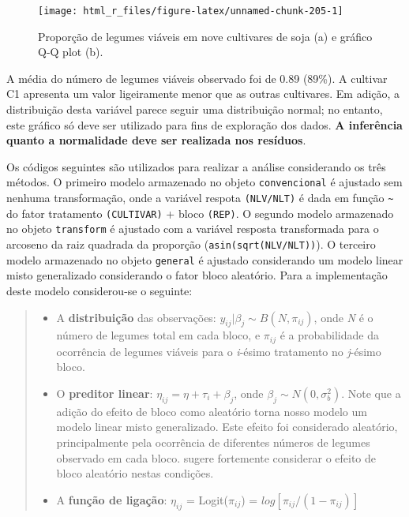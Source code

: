 \documentclass[
]{book}
\begin{document}
\begin{figure}

{\centering \texttt{[image: html\_r\_files/figure-latex/unnamed-chunk-205-1]} 

}

\caption{Proporção de legumes viáveis em nove cultivares de soja (a) e gráfico Q-Q plot (b).}\label{fig:unnamed-chunk-205}
\end{figure}

A média do número de legumes viáveis observado foi de 0.89 (89\%). A cultivar C1 apresenta um valor ligeiramente menor que as outras cultivares. Em adição, a distribuição desta variável parece seguir uma distribuição normal; no entanto, este gráfico só deve ser utilizado para fins de exploração dos dados. \textbf{A inferência quanto a normalidade deve ser realizada nos resíduos}.

Os códigos seguintes são utilizados para realizar a análise considerando os três métodos. O primeiro modelo armazenado no objeto \texttt{convencional} é ajustado sem nenhuma transformação, onde a variável respota \texttt{(NLV/NLT)} é dada em função \texttt{\textasciitilde{}} do fator tratamento \texttt{(CULTIVAR)} + bloco \texttt{(REP)}. O segundo modelo armazenado no objeto \texttt{transform} é ajustado com a variável resposta transformada para o arcoseno da raiz quadrada da proporção (\texttt{asin(sqrt(NLV/NLT))}). O terceiro modelo armazenado no objeto \texttt{general} é ajustado considerando um modelo linear misto generalizado considerando o fator bloco aleatório. Para a implementação deste modelo considerou-se o seguinte:

\begin{quote}
\begin{itemize}
\item
  A \textbf{distribuição} das observações: \(y_{ij}|\beta_j \sim B(N, \pi_{ij})\), onde \emph{N} é o número de legumes total em cada bloco, e \(\pi_{ij}\) é a probabilidade da ocorrência de legumes viáveis para o \emph{i}-ésimo tratamento no \emph{j}-ésimo bloco.
\item
  O \textbf{preditor linear}: \(\eta_{ij} = \eta + \tau_{i} + \beta_j\), onde \(\beta_j \sim N(0, \sigma^2_b)\). Note que a adição do efeito de bloco como aleatório torna nosso modelo um modelo linear misto generalizado. Este efeito foi considerado aleatório, principalmente pela ocorrência de diferentes números de legumes observado em cada bloco. \citet{Stroup2015} sugere fortemente considerar o efeito de bloco aleatório nestas condições.
\item
  A \textbf{função de ligação}: \(\eta_{ij}\) = Logit(\(\pi_{ij}\)) = \(log[\pi_{ij}/(1-\pi_{ij})]\)
\end{itemize}
\end{quote}
\end{document}
